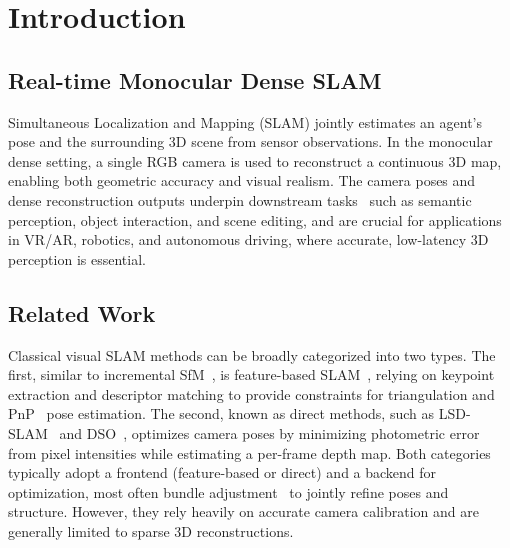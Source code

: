 \vspace{-0.8em}
\section{Introduction}
\label{sec:intro}

\subsection{Real-time Monocular Dense SLAM}
Simultaneous Localization and Mapping (SLAM) jointly estimates an agent's pose and the surrounding 3D scene from sensor observations. In the monocular dense setting, a single RGB camera is used to reconstruct a continuous 3D map, enabling both geometric accuracy and visual realism. The camera poses and dense reconstruction outputs underpin downstream tasks~\cite{sengupta2013urban,armeni2019scenegraph,miao2024scenegraphloc,miao2024volumetric,halacheva2024holistic} such as semantic perception, object interaction, and scene editing, and are crucial for applications in VR/AR, robotics, and autonomous driving, where accurate, low-latency 3D perception is essential.



\subsection{Related Work}
\label{sec:related_work}
Classical visual SLAM methods can be broadly categorized into two types. The first, similar to incremental SfM~\cite{agarwal2011building,schonberger2016structure,liu2024robust}, is feature-based SLAM~\cite{davison2007monoslam,mur2015orb,mur2017orb,campos2021orb}, relying on keypoint extraction and descriptor matching to provide constraints for triangulation and PnP~\cite{lepetit2009ep,kneip2011novel} pose estimation. The second, known as direct methods, such as LSD-SLAM~\cite{engel2014lsd} and DSO~\cite{engel2017direct}, optimizes camera poses by minimizing photometric error from pixel intensities while estimating a per-frame depth map. Both categories typically adopt a frontend (feature-based or direct) and a backend for optimization, most often bundle adjustment~\cite{triggs1999bundle} to jointly refine poses and structure. However, they rely heavily on accurate camera calibration and are generally limited to sparse 3D reconstructions.

